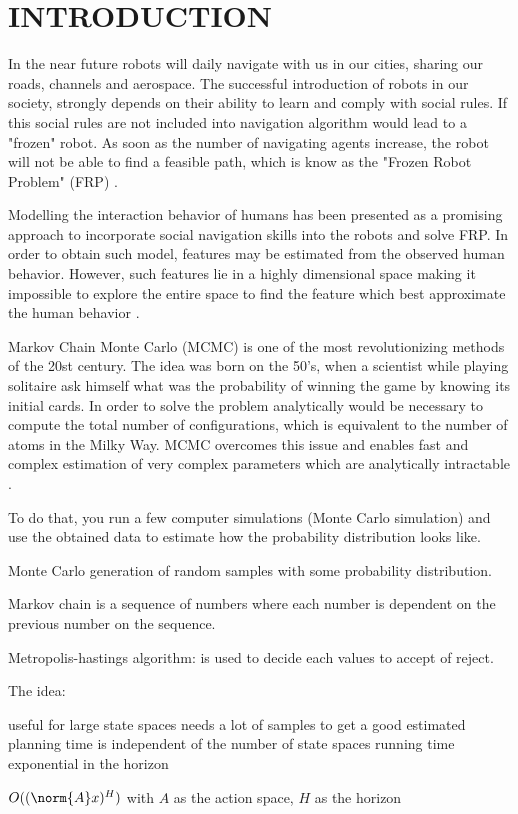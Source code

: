 
\section{INTRODUCTION}

In the near future robots will daily navigate with us in our cities, sharing our roads, channels and aerospace. The successful introduction of robots in our society, strongly depends on their ability to learn and comply with social rules. If this social rules are not included into navigation algorithm would lead to a "frozen" robot. As soon as the number of navigating agents increase, the robot will not be able to find a feasible path, which is know as the "Frozen Robot Problem" (FRP) \cite{Trautman2013}.

Modelling the interaction behavior of humans has been presented as a promising approach to incorporate social navigation skills into the robots and solve FRP. In order to obtain such model, features may be estimated from the observed human behavior. However, such features lie in a highly dimensional space making it impossible to explore the entire space to find the feature which best approximate the human behavior \cite{Kretzschmar2016}.

Markov Chain Monte Carlo (MCMC) is one of the most revolutionizing methods of the 20st century. The idea was born on the 50's, when a scientist while playing solitaire ask himself what was the probability of winning the game by knowing its initial cards. In order to solve the problem analytically would be necessary to compute the total number of configurations, which is equivalent to the number of atoms in the Milky Way. MCMC overcomes this issue and enables fast and complex estimation of very complex parameters which are analytically intractable \cite{Pedersen2017}.  

To do that, you run a few computer simulations (Monte Carlo simulation) and use the obtained data to estimate how the probability distribution looks like.

Monte Carlo generation of random samples with some probability distribution.

Markov chain is a sequence of numbers where each number is dependent on the previous number on the sequence.

Metropolis-hastings algorithm: is used to decide each values to accept of reject. 


The idea: 

useful for large state spaces
needs a lot of samples to get a good estimated
planning time is independent of the number of state spaces
running time exponential in the horizon

$O((\norm{A}x)^H)$ with $A$ as the action space, $H$ as the horizon
\cite{Pedersen2017}
